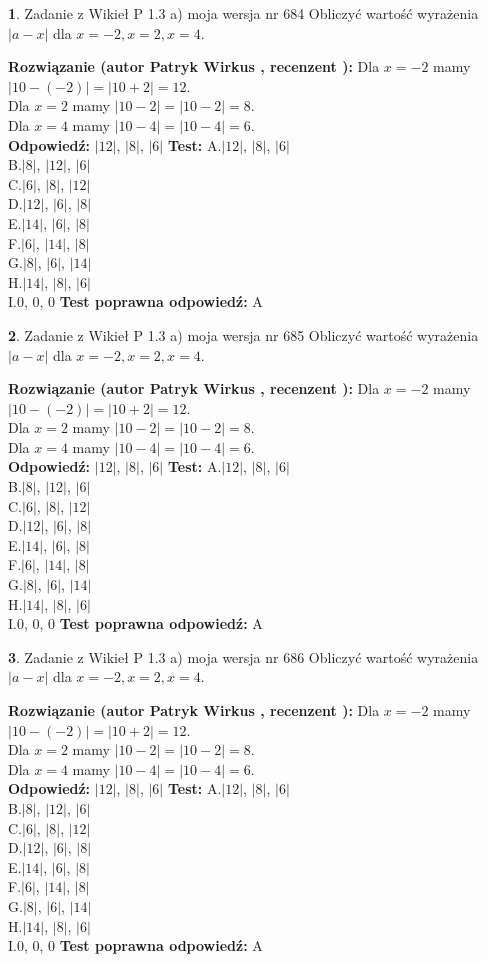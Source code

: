 \documentclass[12pt, a4paper]{article}
\theoremstyle{definition} %
\newtheorem{zad}{}
\newcommand{\zadStart}[1]{\begin{zad}#1\newline}
\newcommand{\zadStop}{\end{zad}}
\newcommand{\rozwStart}[2]{\noindent \textbf{Rozwiązanie (autor #1 , recenzent #2): }\newline}
\newcommand{\rozwStop}{\newline}
\newcommand{\odpStart}{\noindent \textbf{Odpowiedź:}\newline}
\newcommand{\odpStop}{\newline}
\newcommand{\testStart}{\noindent \textbf{Test:}\newline}
\newcommand{\testStop}{\newline}
\newcommand{\kluczStart}{\noindent \textbf{Test poprawna odpowiedź:}\newline}
\newcommand{\kluczStop}{\newline}
\begin{document}
\zadStart{Zadanie z Wikieł P 1.3 a) moja wersja nr 684}
Obliczyć wartość wyrażenia $|a - x|$ dla $x=-2,x=2,x=4$.
\zadStop
\rozwStart{Patryk Wirkus}{}
Dla $x = -2$ mamy $|10 - (-2)| = |10 + 2| = 12$.\\
Dla $x = 2$ mamy $|10 - 2| = |10 - 2| = 8$.\\
Dla $x = 4$ mamy $|10 - 4| = |10 - 4| = 6$.\\
\rozwStop
\odpStart
$|12|$, $|8|$, $|6|$
\odpStop
\testStart
A.$|12|$, $|8|$, $|6|$\\
B.$|8|$, $|12|$, $|6|$\\
C.$|6|$, $|8|$, $|12|$\\
D.$|12|$, $|6|$, $|8|$\\
E.$|14|$, $|6|$, $|8|$\\
F.$|6|$, $|14|$, $|8|$\\
G.$|8|$, $|6|$, $|14|$\\
H.$|14|$, $|8|$, $|6|$\\
I.$0$, $0$, $0$
\testStop
\kluczStart
A
\kluczStop



\zadStart{Zadanie z Wikieł P 1.3 a) moja wersja nr 685}
Obliczyć wartość wyrażenia $|a - x|$ dla $x=-2,x=2,x=4$.
\zadStop
\rozwStart{Patryk Wirkus}{}
Dla $x = -2$ mamy $|10 - (-2)| = |10 + 2| = 12$.\\
Dla $x = 2$ mamy $|10 - 2| = |10 - 2| = 8$.\\
Dla $x = 4$ mamy $|10 - 4| = |10 - 4| = 6$.\\
\rozwStop
\odpStart
$|12|$, $|8|$, $|6|$
\odpStop
\testStart
A.$|12|$, $|8|$, $|6|$\\
B.$|8|$, $|12|$, $|6|$\\
C.$|6|$, $|8|$, $|12|$\\
D.$|12|$, $|6|$, $|8|$\\
E.$|14|$, $|6|$, $|8|$\\
F.$|6|$, $|14|$, $|8|$\\
G.$|8|$, $|6|$, $|14|$\\
H.$|14|$, $|8|$, $|6|$\\
I.$0$, $0$, $0$
\testStop
\kluczStart
A
\kluczStop



\zadStart{Zadanie z Wikieł P 1.3 a) moja wersja nr 686}
Obliczyć wartość wyrażenia $|a - x|$ dla $x=-2,x=2,x=4$.
\zadStop
\rozwStart{Patryk Wirkus}{}
Dla $x = -2$ mamy $|10 - (-2)| = |10 + 2| = 12$.\\
Dla $x = 2$ mamy $|10 - 2| = |10 - 2| = 8$.\\
Dla $x = 4$ mamy $|10 - 4| = |10 - 4| = 6$.\\
\rozwStop
\odpStart
$|12|$, $|8|$, $|6|$
\odpStop
\testStart
A.$|12|$, $|8|$, $|6|$\\
B.$|8|$, $|12|$, $|6|$\\
C.$|6|$, $|8|$, $|12|$\\
D.$|12|$, $|6|$, $|8|$\\
E.$|14|$, $|6|$, $|8|$\\
F.$|6|$, $|14|$, $|8|$\\
G.$|8|$, $|6|$, $|14|$\\
H.$|14|$, $|8|$, $|6|$\\
I.$0$, $0$, $0$
\testStop
\kluczStart
A
\kluczStop
\end{document}
